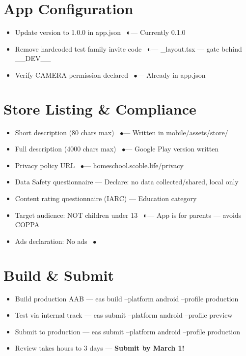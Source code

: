 \documentclass[9pt,letterpaper]{article}
\newcommand{\done}{~\hfill$\bullet$}
\newcommand{\warn}{~\hfill$\LEFTcircle$}
\newcommand{\dt}[1]{{\footnotesize\color{lg}--- #1}}
\begin{document}
\section*{App Configuration}
\begin{itemize}[leftmargin=1.5em, label=$\square$, itemsep=1pt, parsep=0pt, topsep=2pt]
  \item Update version to 1.0.0 in app.json \warn \dt{Currently 0.1.0}
  \item Remove hardcoded test family invite code \warn \dt{\_layout.tsx --- gate behind \_\_DEV\_\_}
  \item Verify CAMERA permission declared \done \dt{Already in app.json}
\end{itemize}

\section*{Store Listing \& Compliance}
\begin{itemize}[leftmargin=1.5em, label=$\square$, itemsep=1pt, parsep=0pt, topsep=2pt]
  \item Short description (80 chars max) \done \dt{Written in mobile/assets/store/}
  \item Full description (4000 chars max) \done \dt{Google Play version written}
  \item Privacy policy URL \done \dt{homeschool.scoble.life/privacy}
  \item Data Safety questionnaire \dt{Declare: no data collected/shared, local only}
  \item Content rating questionnaire (IARC) \dt{Education category}
  \item Target audience: NOT children under 13 \warn \dt{App is for parents --- avoids COPPA}
  \item Ads declaration: No ads \done
\end{itemize}

\section*{Build \& Submit}
\begin{itemize}[leftmargin=1.5em, label=$\square$, itemsep=1pt, parsep=0pt, topsep=2pt]
  \item Build production AAB \dt{eas build --platform android --profile production}
  \item Test via internal track \dt{eas submit --platform android --profile preview}
  \item Submit to production \dt{eas submit --platform android --profile production}
  \item Review takes hours to 3 days \dt{\textbf{Submit by March 1!}}
\end{itemize}
\end{document}
